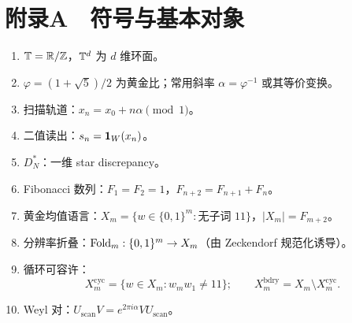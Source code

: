 \section{附录A　符号与基本对象}

\begin{enumerate}
  \item $\mathbb{T}=\mathbb{R}/\mathbb{Z}$，$\mathbb{T}^d$ 为 $d$ 维环面。
  \item $\varphi=(1+\sqrt5)/2$ 为黄金比；常用斜率 $\alpha=\varphi^{-1}$ 或其等价变换。
  \item 扫描轨道：$x_n=x_0+n\alpha\pmod1$。
  \item 二值读出：$s_n=\mathbf{1}_W(x_n)$。
  \item $D_N^*$：一维 star discrepancy。
  \item Fibonacci 数列：$F_1=F_2=1$，$F_{n+2}=F_{n+1}+F_n$。
  \item 黄金均值语言：$X_m=\{w\in\{0,1\}^m:\text{无子词 }11\}$，$|X_m|=F_{m+2}$。
  \item 分辨率折叠：$\mathrm{Fold}_m:\{0,1\}^m\to X_m$（由 Zeckendorf 规范化诱导）。
  \item 循环可容许：
  \[
  X_m^{\mathrm{cyc}}=\{w\in X_m:w_mw_1\neq 11\};
  \qquad
  X_m^{\mathrm{bdry}}=X_m\setminus X_m^{\mathrm{cyc}}.
  \]
  \item Weyl 对：$U_{\mathrm{scan}}V=e^{2\pi i\alpha}VU_{\mathrm{scan}}$。
\end{enumerate}

